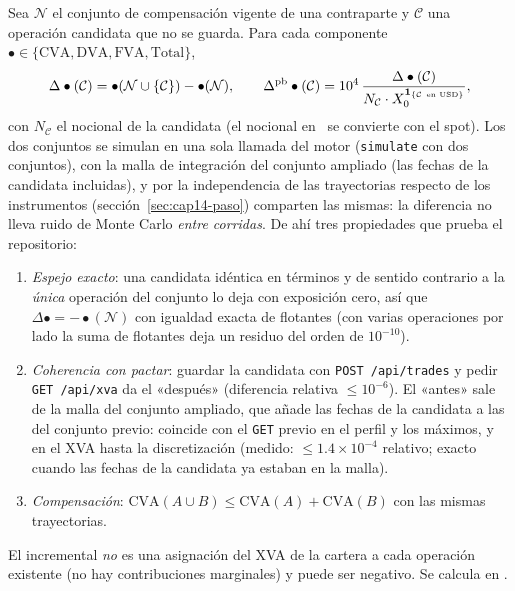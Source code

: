 \begin{sloppypar}
Sea $\mathcal N$ el conjunto de compensación vigente de una contraparte y $\mathcal C$ una operación candidata que no se
guarda. Para cada componente $\bullet\in\{\mathrm{CVA},\mathrm{DVA},\mathrm{FVA},\mathrm{Total}\}$,
\begin{equation}\label{eq:cap14-incremental}
  \Delta\bullet(\mathcal C)=\bullet(\mathcal N\cup\{\mathcal C\})-\bullet(\mathcal N),\qquad
  \Delta^{\mathrm{pb}}\bullet(\mathcal C)=10^{4}\,\frac{\Delta\bullet(\mathcal C)}{N_{\mathcal C}\cdot X_0^{\mathbf 1_{\{\mathcal C\ \text{en USD}\}}}},
\end{equation}
con $N_{\mathcal C}$ el nocional de la candidata (el nocional en \USD\ se convierte con el spot). Los dos conjuntos se simulan
en una sola llamada del motor (\texttt{simulate} con dos conjuntos), con la malla de integración del conjunto ampliado (las fechas de la candidata incluidas), y
por la independencia de las trayectorias respecto de los instrumentos (sección~\ref{sec:cap14-paso}) comparten
las mismas: la diferencia no lleva ruido de Monte Carlo \emph{entre corridas}. De ahí tres propiedades que prueba
el repositorio:
\begin{enumerate}
  \item \emph{Espejo exacto}: una candidata idéntica en términos y de sentido contrario a la \emph{única} operación del
        conjunto lo deja con exposición cero, así que $\Delta\bullet=-\bullet(\mathcal N)$ con igualdad exacta de
        flotantes (con varias operaciones por lado la suma de flotantes deja un residuo del orden de $10^{-10}$).
  \item \emph{Coherencia con pactar}: guardar la candidata con \texttt{POST /api/trades} y pedir \texttt{GET /api/xva}
        da el «después» (diferencia relativa $\le10^{-6}$). El «antes» sale de la malla del conjunto ampliado, que añade
        las fechas de la candidata a las del conjunto previo: coincide con el \texttt{GET} previo en el perfil y los
        máximos, y en el XVA hasta la discretización (medido: $\le1.4\times10^{-4}$ relativo; exacto cuando las fechas de
        la candidata ya estaban en la malla).
  \item \emph{Compensación}: $\mathrm{CVA}(A\cup B)\le\mathrm{CVA}(A)+\mathrm{CVA}(B)$ con las mismas trayectorias.
\end{enumerate}
El incremental \emph{no} es una asignación del XVA de la cartera a cada operación existente (no hay contribuciones
marginales) y puede ser negativo. Se calcula en .
\end{sloppypar}

